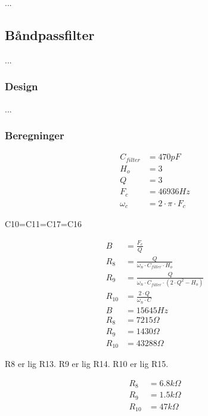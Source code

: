...

\subsection{Båndpassfilter}
...

\subsubsection{Design}
...

\subsubsection{Beregninger}

\begin{equation}
\label{eq:FilterParametre}
\begin{split}
C_{filter} & = 470pF\\
H_o & = 3\\
Q & = 3\\
F_c & = 46936Hz \\
\omega_c & = 2 \cdot \pi \cdot F_c
\end{split}
\end{equation}

C10=C11=C17=C16

\begin{equation}
\label{eq:FilterModstandeBW}
\begin{split}
B & = \frac{F_c}{Q} \\
R_8 & = \frac{Q}{\omega_n \cdot C_{filter} \cdot H_o } \\
R_9 & = \frac{Q}{ \omega_n \cdot C_{filter} \cdot \left( 2 \cdot Q^2 - H_o \right) } \\
R_{10} & = \frac{2 \cdot Q}{ \omega_n \cdot C} \\
B & = 15645Hz \\
R_8 & = 7215 \Omega \\
R_9 & = 1430 \Omega \\
R_{10} & = 43288 \Omega
\end{split}
\end{equation}

R8 er lig R13. R9 er lig R14. R10 er lig R15.

\begin{equation}
\label{eq:FilterModstandeTilnaermelse}
\begin{split}
R_8 & = 6.8k \Omega \\
R_9 & = 1.5k \Omega \\
R_{10} & = 47k \Omega
\end{split}
\end{equation}

